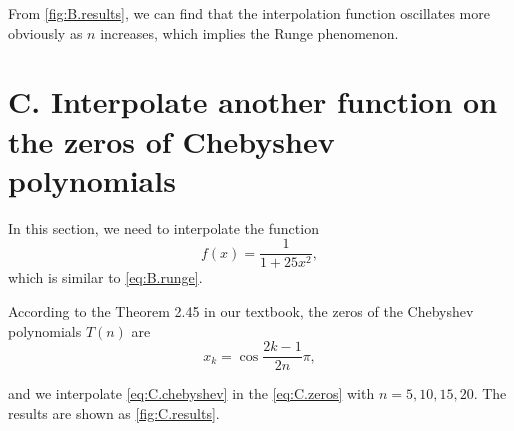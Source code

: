 \documentclass[a4paper]{article}
\begin{document}
From \cref{fig:B.results}, we can find that the interpolation function oscillates more obviously as $n$ increases, which implies the Runge phenomenon.

\section*{C. Interpolate another function on the zeros of Chebyshev polynomials}

In this section, we need to interpolate the function 
\begin{equation}
    f(x) = \frac{1}{1 + 25x^2},
    \label{eq:C.chebyshev}
\end{equation}
which is similar to \cref{eq:B.runge}.

According to the Theorem 2.45 in our textbook, the zeros of the Chebyshev polynomials $T(n)$ are
\begin{equation}
    x_k = \cos \frac{2k - 1}{2n}\pi,
    \label{eq:C.zeros}
\end{equation} 

and we interpolate \cref{eq:C.chebyshev} in the \cref{eq:C.zeros} with $n = 5, 10, 15, 20$.
The results are shown as \cref{fig:C.results}.
\end{document}
